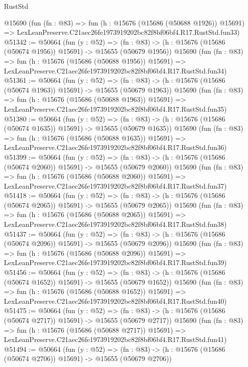 \begin{lexlean}{RustStd}
\begin{coremodule}
    @15690
    (fun (fn : @83) =>
    fun (h : @15676 (@15686 (@50688 @1926)) @15691) =>
    LexLeanPreserve.C21aec26fe1973919202bc82f8bf06bf4.R17.RustStd.fun33)
@51342 := @50664
    (fun (y : @52) =>
    (fn : @83) -> (h : @15676 (@15686 (@50674 @1956)) @15691) -> @15655 (@50679 @1956))
    @15690
    (fun (fn : @83) =>
    fun (h : @15676 (@15686 (@50688 @1956)) @15691) =>
    LexLeanPreserve.C21aec26fe1973919202bc82f8bf06bf4.R17.RustStd.fun34)
@51361 := @50664
    (fun (y : @52) =>
    (fn : @83) -> (h : @15676 (@15686 (@50674 @1963)) @15691) -> @15655 (@50679 @1963))
    @15690
    (fun (fn : @83) =>
    fun (h : @15676 (@15686 (@50688 @1963)) @15691) =>
    LexLeanPreserve.C21aec26fe1973919202bc82f8bf06bf4.R17.RustStd.fun35)
@51380 := @50664
    (fun (y : @52) =>
    (fn : @83) -> (h : @15676 (@15686 (@50674 @1635)) @15691) -> @15655 (@50679 @1635))
    @15690
    (fun (fn : @83) =>
    fun (h : @15676 (@15686 (@50688 @1635)) @15691) =>
    LexLeanPreserve.C21aec26fe1973919202bc82f8bf06bf4.R17.RustStd.fun36)
@51399 := @50664
    (fun (y : @52) =>
    (fn : @83) -> (h : @15676 (@15686 (@50674 @2060)) @15691) -> @15655 (@50679 @2060))
    @15690
    (fun (fn : @83) =>
    fun (h : @15676 (@15686 (@50688 @2060)) @15691) =>
    LexLeanPreserve.C21aec26fe1973919202bc82f8bf06bf4.R17.RustStd.fun37)
@51418 := @50664
    (fun (y : @52) =>
    (fn : @83) -> (h : @15676 (@15686 (@50674 @2065)) @15691) -> @15655 (@50679 @2065))
    @15690
    (fun (fn : @83) =>
    fun (h : @15676 (@15686 (@50688 @2065)) @15691) =>
    LexLeanPreserve.C21aec26fe1973919202bc82f8bf06bf4.R17.RustStd.fun38)
@51437 := @50664
    (fun (y : @52) =>
    (fn : @83) -> (h : @15676 (@15686 (@50674 @2096)) @15691) -> @15655 (@50679 @2096))
    @15690
    (fun (fn : @83) =>
    fun (h : @15676 (@15686 (@50688 @2096)) @15691) =>
    LexLeanPreserve.C21aec26fe1973919202bc82f8bf06bf4.R17.RustStd.fun39)
@51456 := @50664
    (fun (y : @52) =>
    (fn : @83) -> (h : @15676 (@15686 (@50674 @1652)) @15691) -> @15655 (@50679 @1652))
    @15690
    (fun (fn : @83) =>
    fun (h : @15676 (@15686 (@50688 @1652)) @15691) =>
    LexLeanPreserve.C21aec26fe1973919202bc82f8bf06bf4.R17.RustStd.fun40)
@51475 := @50664
    (fun (y : @52) =>
    (fn : @83) -> (h : @15676 (@15686 (@50674 @2717)) @15691) -> @15655 (@50679 @2717))
    @15690
    (fun (fn : @83) =>
    fun (h : @15676 (@15686 (@50688 @2717)) @15691) =>
    LexLeanPreserve.C21aec26fe1973919202bc82f8bf06bf4.R17.RustStd.fun41)
@51494 := @50664
    (fun (y : @52) =>
    (fn : @83) -> (h : @15676 (@15686 (@50674 @2706)) @15691) -> @15655 (@50679 @2706))

\end{coremodule}
\end{lexlean}
